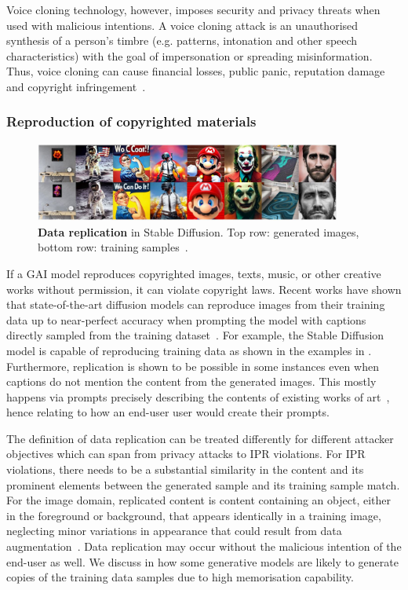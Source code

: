 \documentclass[conference,table]{IEEEtran}
\begin{document}
Voice cloning technology, however, imposes security and privacy threats when used with malicious intentions.
A voice cloning attack is an unauthorised synthesis of a person's timbre (e.g. patterns, intonation and other speech characteristics) with the goal of impersonation or spreading misinformation. 
Thus, voice cloning can cause financial losses, public panic, reputation damage and copyright infringement~\cite{brewster_fraudsters_2021}.

\subsubsection{Reproduction of copyrighted materials} 
    \begin{figure}[ht]
    \centering
    \includegraphics[width=0.9\textwidth]{figures/replicate_userprompts.JPG}
    \caption{\textbf{Data replication} in Stable Diffusion. Top row: generated images, bottom row: training samples~\cite{somepalli_understanding_2023}.}
    \label{fig:replication-user}
\end{figure}
If a GAI model reproduces copyrighted images, texts, music, or other creative works without permission, it can violate copyright laws. 
Recent works have shown that state-of-the-art diffusion models can reproduce images from their training data up to near-perfect accuracy when prompting the model with captions directly sampled from the training dataset~\cite{somepalli_diffusion_2022,carlini_extracting_2023}. 
For example, the Stable Diffusion model is capable of reproducing training data as shown in the examples in .
Furthermore, replication is shown to be possible in some instances even when captions do not mention the content from the generated images. 
This mostly happens via prompts precisely describing the contents of existing works of art~\cite{somepalli_understanding_2023}, hence relating to how an end-user user would create their prompts.

The definition of data replication can be treated differently for different attacker objectives which can span from privacy attacks to IPR violations. 
For IPR violations, there needs to be a substantial similarity in the content and its prominent elements between the generated sample and its training sample match.
For the image domain, replicated content is content containing an object, either in the foreground or background, that appears identically in a training image, neglecting minor variations in appearance that could result from data augmentation~\cite{somepalli_diffusion_2022}.
Data replication may occur without the malicious intention of the end-user as well. 
We discuss in  how some generative models are likely to generate copies of the training data samples due to high memorisation capability. 
\end{document}
